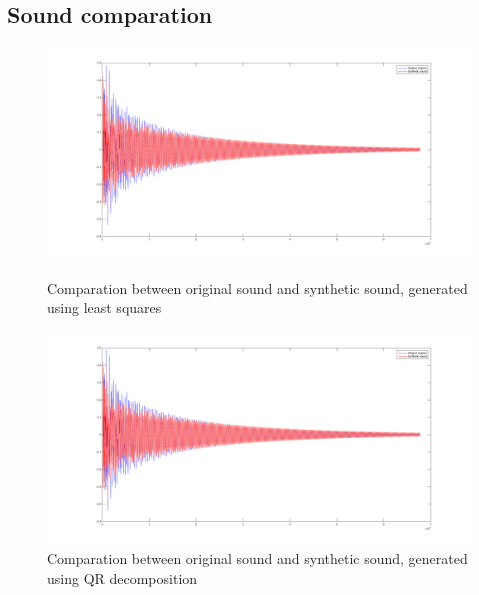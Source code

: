 \documentclass[a4paper]{article}
\begin{document}
\subsection{Sound comparation}
\begin{figure}
	[H] 
	\includegraphics[scale=0.3]{comparation_ab.png} \caption{Comparation between original sound and synthetic sound, generated using least squares} 
	\includegraphics[scale=0.3]{comparation_qr.png} \caption{Comparation between original sound and synthetic sound, generated using QR decomposition}
\end{figure}
\end{document}
